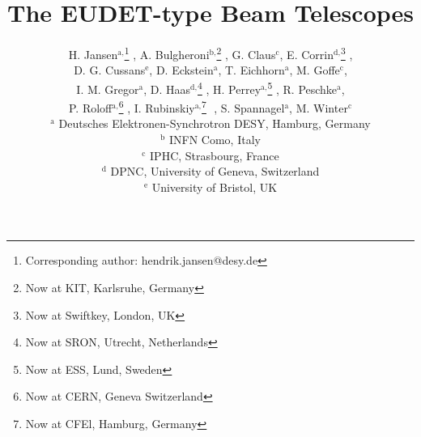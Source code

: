 \documentclass[a4paper,10pt]{scrartcl}
\begin{document}
\linenumbers








\title{The EUDET-type Beam Telescopes}
\author{H. Jansen${}^{\textrm{a,}}$\thanks{Corresponding author: hendrik.jansen@desy.de}\,\,, 
A. Bulgheroni${}^{\textrm{b,}}$\thanks{Now at KIT, Karlsruhe, Germany}\,\,, G. Claus${}^{\textrm{c}}$,
 E. Corrin${}^{\textrm{d,}}$\thanks{Now at Swiftkey, London, UK}\,\,,\\
D. G. Cussans${}^{\textrm{e}}$,
D. Eckstein${}^{\textrm{a}}$, T. Eichhorn${}^{\textrm{a}}$, M. Goffe${}^{\textrm{c}}$,\\
 I. M. Gregor${}^{\textrm{a}}$, 
D. Haas${}^{\textrm{d,}}$\thanks{Now at SRON, Utrecht, Netherlands}\,\,,
 H. Perrey${}^{\textrm{a,}}$\thanks{Now at ESS, Lund, Sweden}\,\,, R. Peschke${}^{\textrm{a}}$, \\
 P. Roloff${}^{\textrm{a,}}$\thanks{Now at CERN, Geneva Switzerland}\,\,, I. Rubinskiy${}^{\textrm{a,}}$\thanks{Now at CFEl, Hamburg, Germany}\,\,\,\,, S. Spannagel${}^{\textrm{a}}$, M. Winter${}^{\textrm{c}}$\\
\normalsize
${}^{\textrm{a}}$ Deutsches Elektronen-Synchrotron DESY, Hamburg, Germany\\
\normalsize
${}^{\textrm{b}}$ INFN Como, Italy\\
\normalsize
${}^{\textrm{c}}$ IPHC, Strasbourg, France\\
\normalsize
${}^{\textrm{d}}$ DPNC, University of Geneva, Switzerland\\
\normalsize
${}^{\textrm{e}}$ University of Bristol, UK\\
}
\maketitle
\end{document}
